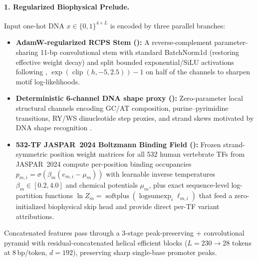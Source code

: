 \documentclass[10.5pt,a4paper]{article}
\begin{document}
\paragraph{1. Regularized Biophysical Prelude.}
Input one-hot DNA $x \in \{0,1\}^{4\times L}$ is encoded by three parallel branches:
\begin{itemize}
\item \textbf{AdamW-regularized RCPS Stem ():} A reverse-complement parameter-sharing 11-bp convolutional stem with standard BatchNorm1d (restoring effective weight decay) and split bounded exponential/SiLU activations following \citet{koo2021}, $\exp(\operatorname{clip}(h,-5,2.5))-1$ on half of the channels to sharpen motif log-likelihoods.
\item \textbf{Deterministic 6-channel DNA shape proxy ():} Zero-parameter local structural channels encoding GC/AT composition, purine--pyrimidine transitions, RY/WS dinucleotide step proxies, and strand skews motivated by DNA shape recognition \citep{rohs2009}.
\item \textbf{532-TF JASPAR~2024 Boltzmann Binding Field ():} Frozen strand-symmetric position weight matrices for all 532 human vertebrate TFs from JASPAR~2024 \citep{rauluseviciute2024} compute per-position binding occupancies $p_{m,i}=\sigma(\beta_m(e_{m,i}-\mu_m))$ with learnable inverse temperatures $\beta_m\in[0.2,4.0]$ and chemical potentials $\mu_m$, plus exact sequence-level log-partition functions $\ln Z_m = \operatorname{softplus}(\operatorname{logsumexp}_i \ell_{m,i})$ that feed a zero-initialized biophysical skip head and provide direct per-TF variant attributions.
\end{itemize}
Concatenated features pass through a 3-stage peak-preserving  +  convolutional pyramid with residual-concatenated helical efficient blocks ($L=230\to 28$ tokens at 8\,bp/token, $d=192$), preserving sharp single-base promoter peaks.
\end{document}
